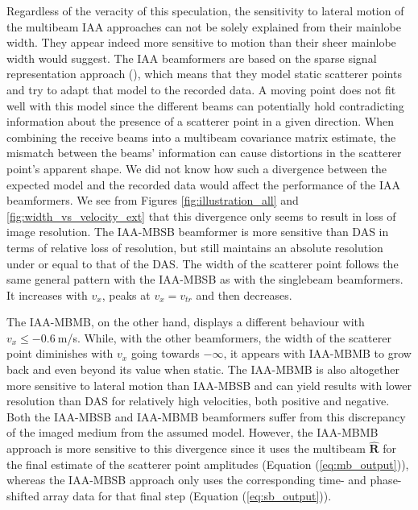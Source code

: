 Regardless of the veracity of this speculation, the sensitivity to lateral motion of the multibeam IAA approaches can not be solely explained from their mainlobe width. They appear indeed more sensitive to motion than their sheer mainlobe width would suggest.
The IAA beamformers are based on the sparse signal representation approach (\cite{Yardibi_nonparametric_IAA}), which means that they model static scatterer points and try to adapt that model to the recorded data.
A moving point does not fit well with this model since the different beams can potentially hold contradicting information about the presence of a scatterer point in a given direction.
When combining the receive beams into a multibeam covariance matrix estimate, the mismatch between the beams' information can cause distortions in the scatterer point's apparent shape.
We did not know how such a divergence between the expected model and the recorded data would affect the performance of the IAA beamformers.
We see from Figures \ref{fig:illustration_all} and \ref{fig:width_vs_velocity_ext} that this divergence only seems to result in loss of image resolution.
The IAA-MBSB beamformer is more sensitive than DAS in terms of relative loss of resolution, but still maintains an absolute resolution under or equal to that of the DAS.
The width of the scatterer point follows the same general pattern with the IAA-MBSB as with the singlebeam beamformers.
It increases with $v_x$, peaks at $v_x = v_{tr}$ and then decreases.

The IAA-MBMB, on the other hand, displays a different behaviour with $v_x \leq -0.6~$m/s. While, with the other beamformers, the width of the scatterer point diminishes with $v_x$ going towards $-\infty$, it appears with IAA-MBMB to grow back and even beyond its value when static.
The IAA-MBMB is also altogether more sensitive to lateral motion than IAA-MBSB and can yield results with lower resolution than DAS for relatively high velocities, both positive and negative.
Both the IAA-MBSB and IAA-MBMB beamformers suffer from this discrepancy of the imaged medium from the assumed model. However, the IAA-MBMB approach is more sensitive to this divergence since it uses the multibeam $\boldsymbol{\hat{R}}$ for the final estimate of the scatterer point amplitudes (Equation (\ref{eq:mb_output})), whereas the IAA-MBSB approach only uses the corresponding time- and phase-shifted array data for that final step (Equation (\ref{eq:sb_output})).

